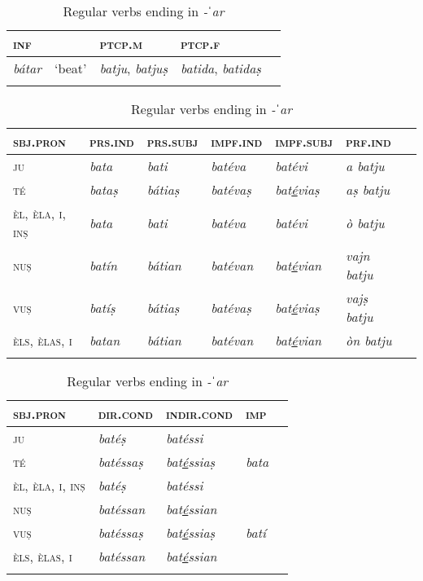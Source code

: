 \begin{table}
	\caption{Regular verbs ending in \textit{-ˈar}}
	\label{conjar1}
	\begin{tabularx}{.7\textwidth}{p{}llll}
		
		\lsptoprule
		\textsc{inf} & & \textsc{ptcp.m}  & \textsc{ptcp.f}\\
		\midrule
		\textit{bátar} & `beat' & \textit{batju}, \textit{batjuṣ} & \textit{batida}, \textit{batidaṣ}\\
		\lspbottomrule  
	\end{tabularx}
	
	\medskip
	
	\begin{tabularx}{\textwidth}{p{}llllll}
		\lsptoprule
		\textsc{sbj.pron} &\textsc{prs.ind} &\textsc{prs.subj} &\textsc{impf.ind} & \textsc{impf.subj} &\textsc{prf.ind}\\
		\midrule
		\textsc{ju} & \textit{bata} & \textit{bati} & \textit{batéva} & \textit{batévi} &  \textit{a batju}\\
		\textsc{té} & \textit{bataṣ} & \textit{bátiaṣ} & \textit{batévaṣ} & \textit{bat\underline{é}viaṣ} & \textit{aṣ batju}\\
		\textsc{èl, èla, i, inṣ} & \textit{bata} & \textit{bati} & \textit{batéva}  & \textit{batévi} & \textit{ò batju}\\
		\textsc{nuṣ} & \textit{batín} & \textit{bátian} & \textit{batévan} & \textit{bat\underline{é}vian} & \textit{vajn batju}\\
		\textsc{vuṣ} & \textit{batíṣ} & \textit{bátiaṣ} &  \textit{batévaṣ} & \textit{bat\underline{é}viaṣ} & \textit{vajṣ batju} \\
		\textsc{èls, èlas, i} & \textit{batan} & \textit{bátian} & \textit{batévan} & \textit{bat\underline{é}vian} & \textit{òn batju} \\
		\lspbottomrule
	\end{tabularx}
	
	\medskip
	
	\begin{tabularx} {\textwidth}{p{2cm}XXXX}
		\lsptoprule
		\textsc{sbj.pron} &\textsc{dir.cond} &  \textsc{indir.cond}    &\textsc{imp}\\
		\midrule
		\textsc{ju} & \textit{batéṣ} & \textit{batéssi} \\
		\textsc{té} & \textit{batéssaṣ} & \textit{bat\underline{é}ssiaṣ} & \textit{bata}\\
		\textsc{èl, èla, i, inṣ} & \textit{batéṣ} & \textit{batéssi}\\
		\textsc{nuṣ} & \textit{batéssan} & \textit{bat\underline{é}ssian} \\
		\textsc{vuṣ} & \textit{batéssaṣ} & \textit{bat\underline{é}ssiaṣ} & \textit{batí} \\
		\textsc{èls, èlas, i} & \textit{batéssan} & \textit{bat\underline{é}ssian}\\
		\lspbottomrule
	\end{tabularx} 
\end{table}

